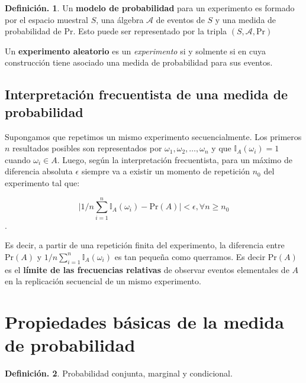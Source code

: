 \documentclass[]{book}
\theoremstyle{definition}
\newtheorem{definition}{Definición.}[chapter]
\theoremstyle{definition}
\theoremstyle{definition}
\theoremstyle{remark}
\begin{document}
\begin{definition}
\protect\hypertarget{def:unnamed-chunk-93}{}{\label{def:unnamed-chunk-93} }
Un \textbf{modelo de probabilidad} para un experimento es
formado por el espacio muestral \(S\), una álgebra
\(\mathcal{A}\) de eventos de \(S\) y
una medida de probabilidad de Pr. Esto puede ser
representado por la tripla \((S, \mathcal{A}, \mbox{Pr})\)

Un \textbf{experimento aleatorio} es un \emph{experimento} si y
solmente si en cuya construcción tiene asociado una
medida de probabilidad
para sus eventos.
\end{definition}

\hypertarget{interpretaciuxf3n-frecuentista-de-una-medida-de-probabilidad}{%
\subsection{Interpretación frecuentista de una medida de probabilidad}\label{interpretaciuxf3n-frecuentista-de-una-medida-de-probabilidad}}

Supongamos que repetimos un mismo experimento
secuencialmente. Los primeros \(n\) resultados posibles
son representados por \(\omega_1 , \omega_2, \ldots, \omega_n\) y que \(\mathbb{I}_A (\omega_i)= 1\)
cuando \(\omega_i \in A\). Luego, según la interpretación
frecuentista, para un máximo de diferencia absoluta
\(\epsilon\) siempre va a existir un momento de repetición
\(n_0\) del experimento tal que:

\[\big | 1/n\sum_{i=1}^{n} \mathbb{I}_A(\omega_i) -
\mbox{Pr}(A)\big |
< \epsilon, \forall n\geq n_0\].

Es decir, a partir de una repetición finita del
experimento, la diferencia entre \(\mbox{Pr}(A)\) y
\(1/n\sum_{i=1}^{n} \mathbb{I}_A(\omega_i)\) es tan
pequeña
como querramos. Es decir Pr\((A)\) es el \textbf{límite de las
frecuencias relativas} de observar eventos elementales
de \(A\) en la replicación secuencial de un mismo
experimento.

\hypertarget{propiedades-buxe1sicas-de-la-medida-de-probabilidad}{%
\section{Propiedades básicas de la medida de probabilidad}\label{propiedades-buxe1sicas-de-la-medida-de-probabilidad}}

\begin{definition}
\protect\hypertarget{def:unnamed-chunk-94}{}{\label{def:unnamed-chunk-94} }Probabilidad conjunta, marginal y condicional.
\end{definition}
\end{document}
